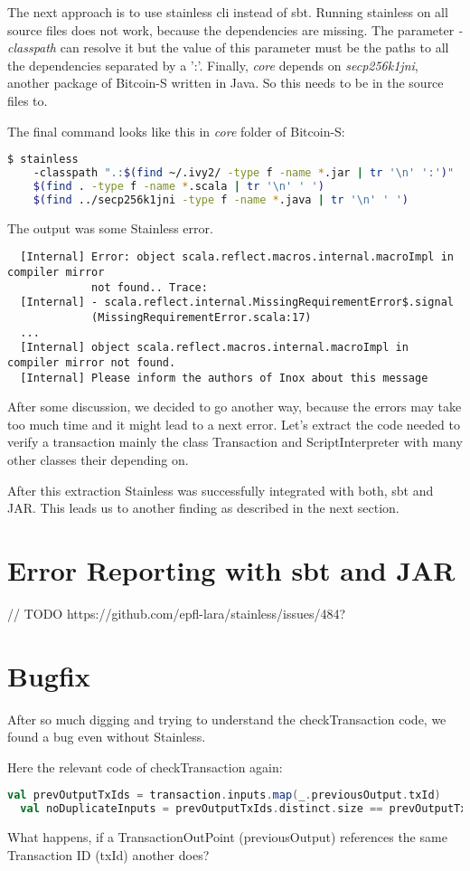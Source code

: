 The next approach is to use stainless cli instead of sbt.
Running stainless on all source files does not work, because the dependencies are missing.
The parameter \emph{-classpath} can resolve it but the value of this parameter must be the paths to all the dependencies separated by a ':'.
Finally, \emph{core} depends on \emph{secp256k1jni}, another package of Bitcoin-S written in Java.
So this needs to be in the source files to.

The final command looks like this in \emph{core} folder of Bitcoin-S:
\begin{lstlisting}[language=bash]
  $ stainless
    -classpath ".:$(find ~/.ivy2/ -type f -name *.jar | tr '\n' ':')"
    $(find . -type f -name *.scala | tr '\n' ' ')
    $(find ../secp256k1jni -type f -name *.java | tr '\n' ' ')
\end{lstlisting}
The output was some Stainless error.
\begin{lstlisting}
  [Internal] Error: object scala.reflect.macros.internal.macroImpl in compiler mirror
             not found.. Trace:
  [Internal] - scala.reflect.internal.MissingRequirementError$.signal
             (MissingRequirementError.scala:17)
  ...
  [Internal] object scala.reflect.macros.internal.macroImpl in compiler mirror not found.
  [Internal] Please inform the authors of Inox about this message
\end{lstlisting}
After some discussion, we decided to go another way, because the errors may take too much time and it might lead to a next error.
Let's extract the code needed to verify a transaction mainly the class Transaction and ScriptInterpreter with many other classes their depending on.

After this extraction Stainless was successfully integrated with both, sbt and JAR.
This leads us to another finding as described in the next section.

\section{Error Reporting with sbt and JAR}
// TODO https://github.com/epfl-lara/stainless/issues/484?

\section{Bugfix}
After so much digging and trying to understand the checkTransaction code, we found a bug even without Stainless.

Here the relevant code of checkTransaction again:
\begin{lstlisting}[language=scala]
  val prevOutputTxIds = transaction.inputs.map(_.previousOutput.txId)
  val noDuplicateInputs = prevOutputTxIds.distinct.size == prevOutputTxIds.size
\end{lstlisting}
What happens, if a TransactionOutPoint (previousOutput) references the same Transaction ID (txId) another does?

